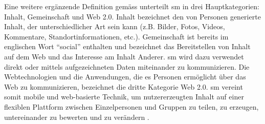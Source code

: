 Eine weitere ergänzende Definition gemäss  unterteilt \gls{sm} in drei Hauptkategorien: Inhalt, Gemeinschaft und Web 2.0. Inhalt bezeichnet den von Personen generierte Inhalt, der unterschiedlicher Art sein kann (z.B. Bilder, Fotos, Videos, Kommentare, Standortinformationen, etc.). Gemeinschaft ist bereits im englischen Wort \textquotedblleft social\textquotedblright{} enthalten und bezeichnet das Bereitstellen von Inhalt auf dem Web und das Interesse am Inhalt Anderer. \gls{sm} wird dazu verwendet direkt oder mittels aufgezeichneten Daten miteinander zu kommunizieren. Die Webtechnologien und die Anwendungen, die es Personen ermöglicht über das Web zu kommunizieren, bezeichnet die dritte Kategorie Web 2.0. \newline
\gls{sm} vereint somit mobile und web-basierte Technik, um nutzererzeugten Inhalt auf einer flexiblen Plattform zwischen Einzelpersonen und Gruppen zu teilen, zu erzeugen, untereinander zu bewerten und zu verändern \cite{Kietzmann:2011}.
 
